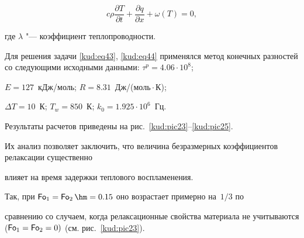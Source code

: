\begin{equation} 

\label{kud:eq45}

c\rho \frac{ \partial T}{\partial t} + \frac{\partial q}{\partial x}+\omega (T)=0,

\end{equation}

где $\lambda $ "--- коэффициент теплопроводности.



Для решения задачи \eqref{kud:eq43}, \eqref{kud:eq44} применялся метод конечных разностей \cite{kud:mc:bib6} со следующими исходными данными: $\tau^p =4.06 \cdot 10^8$; 

$E=127$~кДж/моль; $R=8.31$~Дж/(моль${}\cdot{}$К);

$\Delta T=10$~К; $T_{w} =850$~К; $k_0 =1.925\cdot 10^6$~Гц.



Результаты расчетов приведены на рис.~\ref{kud:pic23}--\ref{kud:pic25}. 

Их анализ позволяет заключить, что величина безразмерных коэффициентов релаксации существенно

влияет на время задержки теплового воспламенения. 

Так, при $\operatorname{\sf Fo}_ 1 =\operatorname{\sf Fo}_2 \hm =0.15$ оно возрастает примерно на~$1/3$ по

сравнению со случаем, когда релаксационные свойства материала не учитываются ($\operatorname{\sf Fo}_ 1 =\operatorname{\sf Fo}_2 =0)$ (см. рис.~\ref{kud:pic23}).



